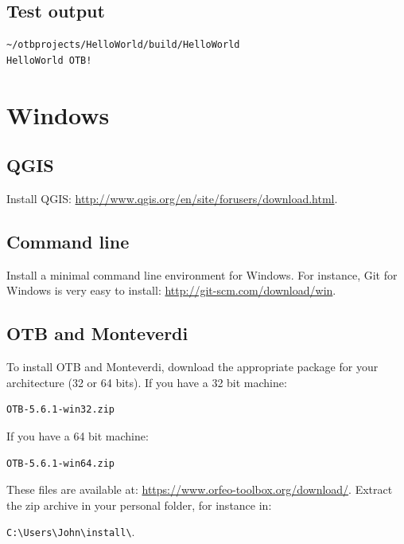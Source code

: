 \documentclass[10pt,a4paper]{article}
\begin{document}
\subsection{Test output}

\begin{verbatim}
~/otbprojects/HelloWorld/build/HelloWorld
HelloWorld OTB!
\end{verbatim}

\section{Windows}


\subsection{QGIS}
Install QGIS: \url{http://www.qgis.org/en/site/forusers/download.html}.

\subsection{Command line}
Install a minimal command line environment for Windows. For instance, Git for Windows is very easy to install:
\url{http://git-scm.com/download/win}.

\subsection{OTB and Monteverdi}
To install OTB and Monteverdi, download the appropriate package for your architecture (32 or 64 bits). If you have a 32 bit machine:

\begin{verbatim}
OTB-5.6.1-win32.zip
\end{verbatim}

If you have a 64 bit machine:

\begin{verbatim}
OTB-5.6.1-win64.zip
\end{verbatim}

These files are available at:
\url{https://www.orfeo-toolbox.org/download/}.
Extract the zip archive in your personal folder, for instance in:\\
\begin{centering}
\texttt{C:{\textbackslash}Users{\textbackslash}John{\textbackslash}install{\textbackslash}}.
\end{centering}
\end{document}
